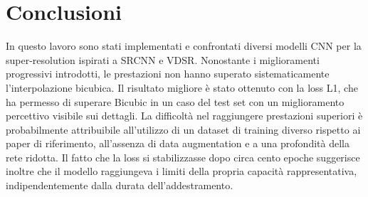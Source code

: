 \section{Conclusioni}
In questo lavoro sono stati implementati e
confrontati diversi modelli CNN per la super-resolution ispirati
a SRCNN\cite{dong2014srcnn} e VDSR\cite{kim2015accurate}.
 Nonostante i miglioramenti progressivi introdotti,
 le prestazioni non hanno superato sistematicamente l'interpolazione bicubica.
 Il risultato migliore è stato ottenuto con la loss L1,
 che ha permesso di superare Bicubic in un caso del test set con un
 miglioramento percettivo visibile sui dettagli.
 La difficoltà nel raggiungere prestazioni superiori è probabilmente
 attribuibile all'utilizzo di un dataset di training diverso rispetto ai paper di riferimento,
 all'assenza di data augmentation e a una profondità della rete ridotta.
 Il fatto che la loss si stabilizzasse dopo circa cento epoche suggerisce
 inoltre che il modello raggiungeva i limiti della propria capacità rappresentativa,
 indipendentemente dalla durata dell'addestramento.